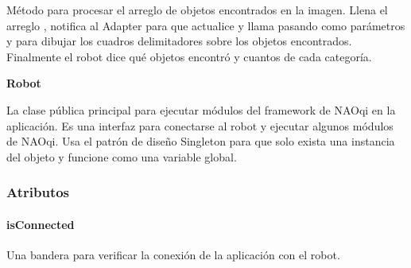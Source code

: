 \begin{fulllineitems}
\label{\detokenize{dev_docs:com.lar.cloudnao.ObjectDetectionActivity.processObjectDetectionJSONArray(JSONArray)}}
Método para procesar el arreglo de objetos encontrados en la imagen. Llena el arreglo 
, notifica al Adapter para que actualice 
{\hyperref[\detokenize{dev_docs:com.lar.cloudnao.ObjectDetectionActivity.foundObjectsLV}]{}} y llama 
 pasando como parámetros  y 
{\hyperref[\detokenize{dev_docs:com.lar.cloudnao.OCRTranslationActivity.mRobotImage}]{}} para dibujar los cuadros delimitadores sobre los objetos encontrados. Finalmente el robot dice qué objetos encontró y cuantos de cada categoría.

\end{fulllineitems}



\textbf{Robot}
\label{\detokenize{dev_docs:robot}}

\begin{fulllineitems}
\label{\detokenize{dev_docs:com.lar.cloudnao.Robot}}
La clase pública principal para ejecutar módulos del framework de NAOqi en la aplicación. Es una interfaz para conectarse al robot y ejecutar algunos módulos de NAOqi. Usa el patrón de diseño Singleton para que solo exista una instancia del objeto y funcione como una variable global.

\end{fulllineitems}



\subsubsection{Atributos}
\label{\detokenize{dev_docs:id33}}

\paragraph{isConnected}
\label{\detokenize{dev_docs:isconnected}}

\begin{fulllineitems}
\label{\detokenize{dev_docs:com.lar.cloudnao.Robot.isConnected}}
Una bandera para verificar la conexión de la aplicación con el robot.

\end{fulllineitems}



